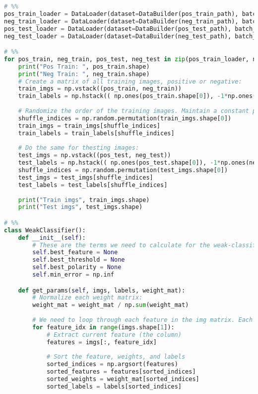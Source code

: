 \documentclass{article}
\begin{document}
\begin{lstlisting}[language=Python]
# %%
pos_train_loader = DataLoader(dataset=DataBuilder(pos_train_path), batch_size=num_pos_train, shuffle=True)
neg_train_loader = DataLoader(dataset=DataBuilder(neg_train_path), batch_size=num_neg_train, shuffle=True)
pos_test_loader = DataLoader(dataset=DataBuilder(pos_test_path), batch_size=num_pos_test, shuffle=True)
neg_test_loader = DataLoader(dataset=DataBuilder(neg_test_path), batch_size=num_neg_test, shuffle=True)

# %%
for pos_train, neg_train, pos_test, neg_test in zip(pos_train_loader, neg_train_loader, pos_test_loader, neg_test_loader):
    print("Pos Train: ", pos_train.shape)
    print("Neg Train: ", neg_train.shape)
    # Create a matrix of all training images, positive or negative:
    train_imgs = np.vstack((pos_train, neg_train))
    train_labels = np.hstack(( np.ones(pos_train.shape[0]), -1*np.ones(neg_train.shape[0])) )
    
    # Randomize the order of the training images. Maintain a constant pairing of label to img though
    shuffle_indices = np.random.permutation(train_imgs.shape[0])
    train_imgs = train_imgs[shuffle_indices]
    train_labels = train_labels[shuffle_indices]
    
    # Do the same for thesting images:
    test_imgs = np.vstack((pos_test, neg_test))
    test_labels = np.hstack(( np.ones(pos_test.shape[0]), -1*np.ones(neg_test.shape[0])) )
    shuffle_indices = np.random.permutation(test_imgs.shape[0])
    test_imgs = test_imgs[shuffle_indices]
    test_labels = test_labels[shuffle_indices]
    
    print("Train imgs", train_imgs.shape)
    print("Test imgs", test_imgs.shape)

# %%
class WeakClassifier():
    def __init__(self):
        # These are the terms we need to calculate for the weak-classifier:
        self.best_feature = None
        self.best_threshold = None
        self.best_polarity = None
        self.min_error = np.inf

    def get_params(self, imgs, labels, weight_mat):
        # Normalize each weight matrix:
        weight_mat = weight_mat / np.sum(weight_mat)
    
        # We need to loop through each feature in the img matrix. Each feature is counted as a column in that matrix:
        for feature_idx in range(imgs.shape[1]):
            # Extract current feature (the column)
            features = imgs[:, feature_idx]
            
            # Sort the feature, weights, and labels
            sorted_indices = np.argsort(features)
            sorted_features = features[sorted_indices]
            sorted_weights = weight_mat[sorted_indices]
            sorted_labels = labels[sorted_indices]
            

\end{lstlisting}
\end{document}
